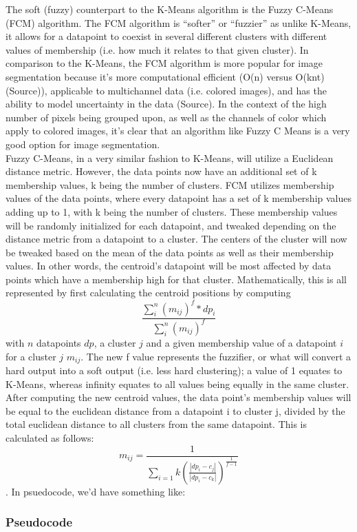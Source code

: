 \documentclass[10pt,twocolumn]{article}
\begin{document}
\indent The soft (fuzzy) counterpart to the K-Means algorithm is the Fuzzy C-Means (FCM) algorithm. The FCM algorithm is “softer” or “fuzzier” as unlike K-Means, it allows for a datapoint to coexist in several different clusters with different values of membership (i.e. how much it relates to that given cluster). In comparison to the K-Means, the FCM algorithm is more popular for image segmentation because it’s more computational efficient (O(n) versus O(knt) (Source)), applicable to multichannel data (i.e. colored images), and has the ability to model uncertainty in the data (Source). In the context of the high number of pixels being grouped upon, as well as the channels of color which apply to colored images, it’s clear that an algorithm like Fuzzy C Means is a very good option for image segmentation.
\\
\indent Fuzzy C-Means, in a very similar fashion to K-Means, will utilize a Euclidean distance metric. However, the data points now have an additional set of k membership values, k being the number of clusters. FCM utilizes membership values of the data points, where every datapoint has a set of k membership values adding up to 1, with k being the number of clusters. These membership values will be randomly initialized for each datapoint, and tweaked depending on the distance metric from a datapoint to a cluster. The centers of the cluster will now be tweaked based on the mean of the data points as well as their membership values. In other words, the centroid’s datapoint will be most affected by data points which have a membership high for that cluster. Mathematically, this is all represented by first calculating the centroid positions by computing \[ \frac{ \sum_{i}^{n} (m_{ij})^f * dp_i  }{  \sum_{i}^{n} (m_{ij})^f  }\] with \(n\) datapoints \(dp\), a cluster \(j\) and a given membership value of a datapoint \(i\) for a cluster \(j\) \(m_{ij}\). The new f value represents the fuzzifier, or what will convert a hard output into a soft output (i.e. less hard clustering); a value of 1 equates to K-Means, whereas infinity equates to all values being equally in the same cluster. After computing the new centroid values, the data point’s membership values will be equal to the euclidean distance from a datapoint i to cluster j, divided by the total euclidean distance to all clusters from the same datapoint. This is calculated as follows: \[m_{ij} = \frac{1}{\sum_{i=1}{k} (\frac{|dp_i - c_j|}{|dp_i - c_k|})^{\frac{1}{f-1}}} \]. In psuedocode, we'd have something like:

\subsubsection {Pseudocode}
\end{document}

